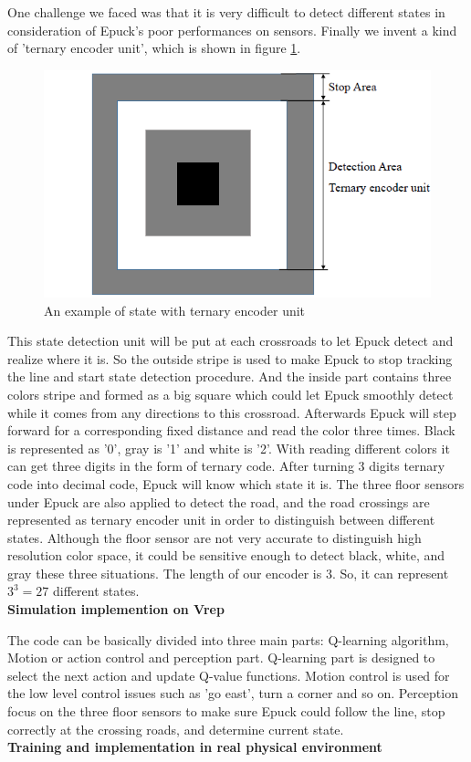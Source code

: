 \documentclass[a4paper, 11pt]{article} %
\begin{document}
One challenge we faced was that it is very difficult to detect different states in consideration of Epuck's poor performances on sensors. Finally we invent a kind of 'ternary encoder unit', which is shown in figure \ref{fig2}. 
\begin{figure}[tb]
\centering 
\includegraphics[width=0.6\columnwidth]{encoder} 
\caption[An example of a floating figure]{An example of state with ternary encoder unit} %
\label{fig2} 
\end{figure}
This state detection unit will be put at each crossroads to let Epuck detect and realize where it is. 
So the outside stripe is used to make Epuck to stop tracking the line and start state detection procedure. 
And the inside part contains three colors stripe and formed as a big square which could let Epuck smoothly detect while it comes from any directions to this crossroad. 
Afterwards Epuck will step forward for a corresponding fixed distance and read the color three times. 
Black is represented as '0', gray is '1' and white is '2'. With reading different colors it can get three digits in the form of ternary code. 
After turning 3 digits ternary code into decimal code, Epuck will know which state it is.
The three floor sensors under Epuck are also applied to detect the road, and the
road crossings are represented as ternary encoder unit in order to distinguish
between different states. Although the floor sensor are not very accurate to
distinguish high resolution color space, it could be sensitive enough to detect
black, white, and gray these three situations. The length of our encoder is 3.
So, it can represent $3^3 = 27$ different states.
\\[3ex]
\textbf{Simulation implemention on Vrep}

The code can be basically divided
into three main parts: Q-learning algorithm, Motion or action control and
perception part. Q-learning part is designed to select the next action and update
Q-value functions. Motion control is used for the low level control issues such as
'go east', turn a corner and so on. Perception focus on the three floor sensors
to make sure Epuck could follow the line, stop correctly at the crossing roads,
and determine current state.
\\[3ex]
\textbf{Training and implementation in real physical environment}
\end{document}
